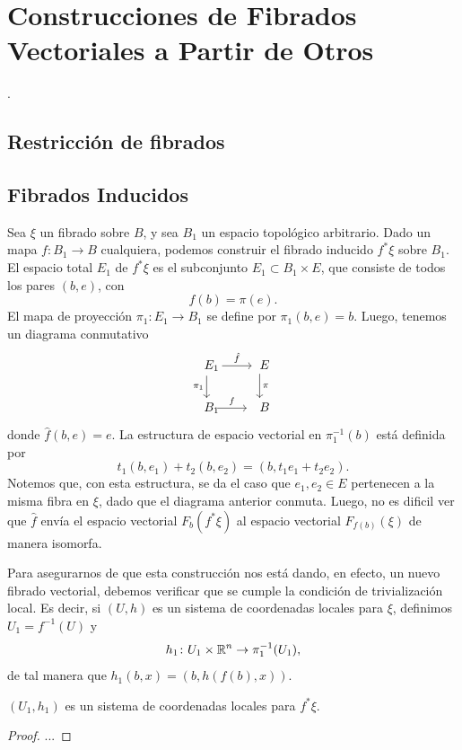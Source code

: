 \newpage
\section{Construcciones de Fibrados Vectoriales a Partir de Otros}

\cite[\S 3]{ClasesCaracteristicas}.

\subsection{Restricción de fibrados}

\subsection{Fibrados Inducidos}

Sea $\xi$ un fibrado sobre $B$, y sea $B_{1}$ un espacio topológico arbitrario. Dado un mapa $f \colon B_{1} \to B$ cualquiera, podemos construir el fibrado inducido $f^{*} \xi$ sobre $B_{1}$. El espacio total $E_{1}$ de $f^{*} \xi$ es el subconjunto $E_{1} \subset B_{1} \times E$, que consiste de todos los pares $(b,e)$, con
\[ f(b) = \pi(e). \]
El mapa de proyección $\pi_{1} \colon E_{1} \to B_{1}$ se define por $\pi_{1}(b,e) = b$. Luego, tenemos un diagrama conmutativo
\[ \begin{tikzcd}
E_1 \arrow[r, "\hat{f}", xshift=-2pt] \arrow[d, "\pi_1"', xshift=-4pt]      & E \arrow[d, "\pi", xshift=-4pt] \\
B_1 \arrow[r, "f"{xshift=-4pt}, shorten <=-4pt, shorten >=4pt, xshift=-2pt] & B
\end{tikzcd} \]
donde $\hat{f}(b,e) = e$. La estructura de espacio vectorial en $\pi_{1}^{-1}(b)$ está definida por
\[ t_{1}(b,e_{1}) + t_{2}(b,e_{2}) = (b, t_{1}e_{1} + t_{2}e_{2}). \]
Notemos que, con esta estructura, se da el caso que $e_{1},e_{2} \in E$ pertenecen a la misma fibra en $\xi$, dado que el diagrama anterior conmuta. Luego, no es dificil ver que $\hat{f}$ envía el espacio vectorial $F_{b}(f^{*}\xi)$ al espacio vectorial $F_{f(b)}(\xi)$ de manera isomorfa. \par
Para asegurarnos de que esta construcción nos está dando, en efecto, un nuevo fibrado vectorial, debemos verificar que se cumple la condición de trivialización local. Es decir, si $(U,h)$ es un sistema de coordenadas locales para $\xi$, definimos $U_{1} = f^{-1}(U)$ y
\[ h_{1} \colon U_{1} \times \mathbb{R}^{n} \to \pi_{1}^{-1}(U_{1}), \]
de tal manera que $h_{1}(b,x) = (b, h(f(b), x))$.
\begin{lemma}
	$(U_{1}, h_{1})$ es un sistema de coordenadas locales para $f^{*}\xi$.
\end{lemma}
\begin{proof}
	...
\end{proof}

